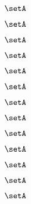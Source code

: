 \begin{forslides}
    \begin{equation}
        \label{eq:parallelism-165}
        \setA
    \end{equation}

    \begin{equation}
        \label{eq:parallelism-166}
        \setA
    \end{equation}

    \begin{equation}
        \label{eq:parallelism-167}
        \setA
    \end{equation}

    \begin{equation}
        \label{eq:parallelism-168}
        \setA
    \end{equation}

    \begin{equation}
        \label{eq:parallelism-169}
        \setA
    \end{equation}

    \begin{equation}
        \label{eq:parallelism-170}
        \setA
    \end{equation}

    \begin{equation}
        \label{eq:parallelism-171}
        \setA
    \end{equation}

    \begin{equation}
        \label{eq:parallelism-172}
        \setA
    \end{equation}

    \begin{equation}
        \label{eq:parallelism-173}
        \setA
    \end{equation}

    \begin{equation}
        \label{eq:parallelism-174}
        \setA
    \end{equation}

    \begin{equation}
        \label{eq:parallelism-175}
        \setA
    \end{equation}

    \begin{equation}
        \label{eq:parallelism-176}
        \setA
    \end{equation}

    \begin{equation}
        \label{eq:parallelism-177}
        \setA
    \end{equation}


\end{forslides}
